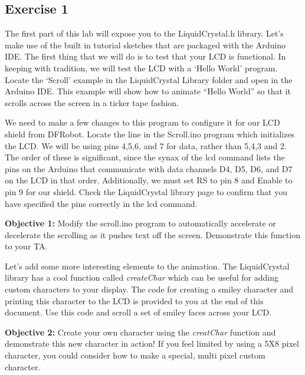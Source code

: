 \documentclass[10pt]{report}
\begin{document}
\subsection*{Exercise 1}
\par The first part of this lab will expose you to the LiquidCrystal.h library. Let’s make use of the built in tutorial sketches that are packaged with the Arduino IDE. The first thing that we will do is to test that your LCD is functional. In keeping with tradition, we will test the LCD with a ‘Hello World’ program. Locate the ‘Scroll’ example in the LiquidCrystal Library folder and open in the Arduino IDE. This example will show how to animate “Hello World” so that it scrolls across the screen in a ticker tape fashion.
\par We need to make a few changes to this program to configure it for our LCD shield from DFRobot. Locate the line in the Scroll.ino program which initializes the LCD. We will be using pins 4,5,6, and 7 for data, rather than 5,4,3 and 2. The order of these is significant, since the synax of the lcd command lists the pins on the Arduino that communicate with data channels D4, D5, D6, and D7 on the LCD in that order. Additionally, we must set RS to pin 8 and Enable to pin 9 for our shield. Check the LiquidCrystal library page to confirm that you have specified the pins correctly in the lcd command.
\par 
\textbf{Objective 1:} Modify the scroll.ino program to automatically accelerate or decelerate the scrolling as it pushes text off the screen. Demonstrate this function to your TA. 
\par Let’s add some more interesting elements to the animation. The LiquidCrystal library has a cool function called \emph{createChar}  which can be useful for adding custom characters to your display. The code for creating a smiley character and printing this character to the LCD is provided to you at the end of this document. Use this code and scroll a set of smiley faces across your LCD. 
\par
 \textbf{Objective 2:} Create your own character using the \emph{creatChar} function and demonstrate this new character in action! If you feel limited by using a 5X8 pixel character, you could consider how to make a special, multi pixel custom character. 
\end{document}
